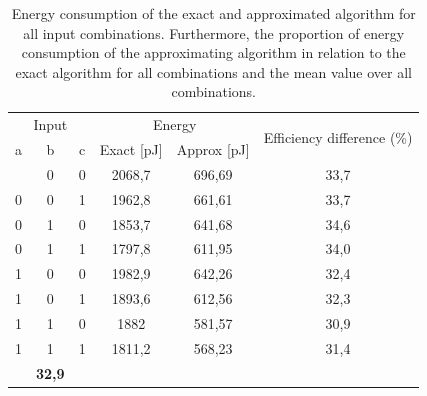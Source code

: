 \documentclass[]{IEEEtran}
\begin{document}
\begin{table}[h]
\centering
\begin{tabular}{|ccccc|c|}
\hline
\multicolumn{3}{|c|}{Input}                                               & \multicolumn{2}{c|}{Energy}          & \multirow{2}{*}{Efficiency difference (\%)} \\ \cline{1-5}
\multicolumn{1}{|c|}{a} & \multicolumn{1}{c|}{b} & \multicolumn{1}{c|}{c} & \multicolumn{1}{c|}{Exact {[}pJ{]}} & Approx {[}pJ{]} &  \\ \hline \addlinespace[1ex] \hline
\multicolumn{1}{|c|}{0} & \multicolumn{1}{c|}{0} & \multicolumn{1}{c|}{0} & \multicolumn{1}{c|}{2068,7} & 696,69 & 33,7                                        \\ \hline
\multicolumn{1}{|c|}{0} & \multicolumn{1}{c|}{0} & \multicolumn{1}{c|}{1} & \multicolumn{1}{c|}{1962,8} & 661,61 & 33,7                                        \\ \hline
\multicolumn{1}{|c|}{0} & \multicolumn{1}{c|}{1} & \multicolumn{1}{c|}{0} & \multicolumn{1}{c|}{1853,7} & 641,68 & 34,6                                        \\ \hline
\multicolumn{1}{|c|}{0} & \multicolumn{1}{c|}{1} & \multicolumn{1}{c|}{1} & \multicolumn{1}{c|}{1797,8} & 611,95 & 34,0                                        \\ \hline
\multicolumn{1}{|c|}{1} & \multicolumn{1}{c|}{0} & \multicolumn{1}{c|}{0} & \multicolumn{1}{c|}{1982,9} & 642,26 & 32,4                                        \\ \hline
\multicolumn{1}{|c|}{1} & \multicolumn{1}{c|}{0} & \multicolumn{1}{c|}{1} & \multicolumn{1}{c|}{1893,6} & 612,56 & 32,3                                        \\ \hline
\multicolumn{1}{|c|}{1} & \multicolumn{1}{c|}{1} & \multicolumn{1}{c|}{0} & \multicolumn{1}{c|}{1882}   & 581,57 & 30,9                                        \\ \hline
\multicolumn{1}{|c|}{1} & \multicolumn{1}{c|}{1} & \multicolumn{1}{c|}{1} & \multicolumn{1}{c|}{1811,2} & 568,23 & 31,4                                        \\ \hline \addlinespace[1ex] \hline
\multicolumn{5}{|r|}{\textbf{Mean}}                                                                              & \textbf{32,9}                               \\ \hline
\end{tabular}
\caption{Energy consumption of the exact and approximated algorithm for all input combinations. Furthermore, the proportion of energy consumption of the approximating algorithm in relation to the exact algorithm for all combinations and the mean value over all combinations.}
\label{tab:energy}
\end{table}
\end{document}

